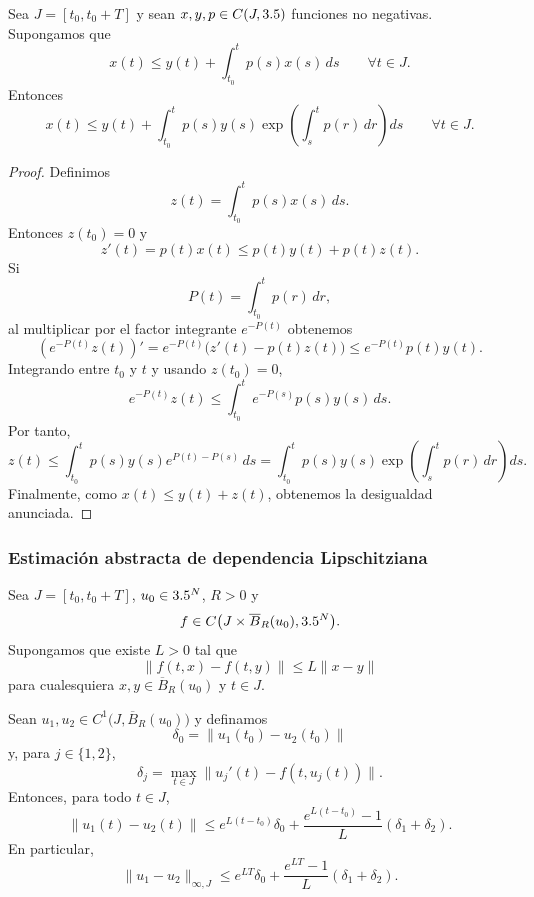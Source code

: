 \begin{lema}
    Sea $J=[t_0,t_0+T]$ y sean $x,y,p\in C(J,3.5)$ funciones no negativas. Supongamos que
    \[
        x(t)\leq y(t)+\int_{t_0}^t p(s)x(s)\,ds
        \qquad \forall t\in J.
    \]
    Entonces
    \[
        x(t)\leq y(t)+\int_{t_0}^t p(s)y(s)
        \exp\left(\int_s^t p(r)\,dr\right)ds
        \qquad \forall t\in J.
    \]
\end{lema}

\begin{proof}
    Definimos
    \[
        z(t)=\int_{t_0}^t p(s)x(s)\,ds.
    \]
    Entonces $z(t_0)=0$ y
    \[
        z'(t)=p(t)x(t)\leq p(t)y(t)+p(t)z(t).
    \]
    Si
    \[
        P(t)=\int_{t_0}^t p(r)\,dr,
    \]
    al multiplicar por el factor integrante $e^{-P(t)}$ obtenemos
    \[
        \left(e^{-P(t)}z(t)\right)'
        =e^{-P(t)}\bigl(z'(t)-p(t)z(t)\bigr)
        \leq e^{-P(t)}p(t)y(t).
    \]
    Integrando entre $t_0$ y $t$ y usando $z(t_0)=0$,
    \[
        e^{-P(t)}z(t)
        \leq
        \int_{t_0}^t e^{-P(s)}p(s)y(s)\,ds.
    \]
    Por tanto,
    \[
        z(t)
        \leq
        \int_{t_0}^t p(s)y(s)e^{P(t)-P(s)}\,ds
        =
        \int_{t_0}^t p(s)y(s)
        \exp\left(\int_s^t p(r)\,dr\right)ds.
    \]
    Finalmente, como $x(t)\leq y(t)+z(t)$, obtenemos la desigualdad anunciada.
\end{proof}

\subsubsection{Estimación abstracta de dependencia Lipschitziana}

\begin{teorema}
    Sea $J=[t_0,t_0+T]$, $u_0\in3.5^N$, $R>0$ y
    \[
        f\in C\bigl(J\times\overline{B}_R(u_0),3.5^N\bigr).
    \]
    Supongamos que existe $L>0$ tal que
    \[
        \|f(t,x)-f(t,y)\|\leq L\|x-y\|
    \]
    para cualesquiera $x,y\in\overline{B}_R(u_0)$ y $t\in J$.

    Sean $u_1,u_2\in C^1\bigl(J,\overline{B}_R(u_0)\bigr)$ y definamos
    \[
        \delta_0=\|u_1(t_0)-u_2(t_0)\|
    \]
    y, para $j\in\{1,2\}$,
    \[
        \delta_j=
        \max_{t\in J}\|u_j'(t)-f(t,u_j(t))\|.
    \]
    Entonces, para todo $t\in J$,
    \[
        \|u_1(t)-u_2(t)\|
        \leq
        e^{L(t-t_0)}\delta_0
        +\frac{e^{L(t-t_0)}-1}{L}(\delta_1+\delta_2).
    \]
    En particular,
    \[
        \|u_1-u_2\|_{\infty,J}
        \leq
        e^{LT}\delta_0
        +\frac{e^{LT}-1}{L}(\delta_1+\delta_2).
    \]
\end{teorema}

